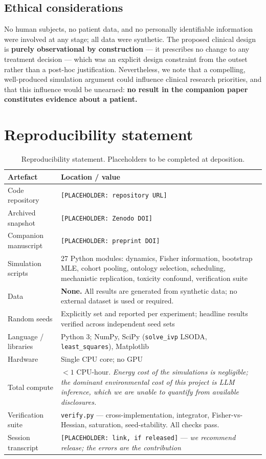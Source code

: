 \documentclass[11pt,a4paper]{article}
\begin{document}
\subsection{Ethical considerations}

No human subjects, no patient data, and no personally identifiable information were
involved at any stage; all data were synthetic. The proposed clinical design is
\textbf{purely observational by construction} --- it prescribes no change to any
treatment decision --- which was an explicit design constraint from the outset rather
than a post-hoc justification. Nevertheless, we note that a compelling, well-produced
simulation argument could influence clinical research priorities, and that this
influence would be unearned: \textbf{no result in the companion paper constitutes
evidence about a patient.}

\section{Reproducibility statement}

\begin{table}[h]
\centering
\small
\begin{tabular}{p{4.3cm}p{9.5cm}}
\toprule
\textbf{Artefact} & \textbf{Location / value}\\
\midrule
Code repository & \texttt{[PLACEHOLDER: repository URL]}\\
Archived snapshot & \texttt{[PLACEHOLDER: Zenodo DOI]}\\
Companion manuscript & \texttt{[PLACEHOLDER: preprint DOI]}\\
Simulation scripts & 27 Python modules: dynamics, Fisher information, bootstrap MLE, cohort pooling, ontology selection, scheduling, mechanistic replication, toxicity confound, verification suite\\
Data & \textbf{None.} All results are generated from synthetic data; no external dataset is used or required.\\
Random seeds & Explicitly set and reported per experiment; headline results verified across independent seed sets\\
Language / libraries & Python 3; NumPy, SciPy (\texttt{solve\_ivp} LSODA, \texttt{least\_squares}), Matplotlib\\
Hardware & Single CPU core; no GPU\\
Total compute & $<1$ CPU-hour. \emph{Energy cost of the simulations is negligible; the dominant environmental cost of this project is LLM inference, which we are unable to quantify from available disclosures.}\\
Verification suite & \texttt{verify.py} --- cross-implementation, integrator, Fisher-vs-Hessian, saturation, seed-stability. All checks pass.\\
Session transcript & \texttt{[PLACEHOLDER: link, if released]} --- \emph{we recommend release; the errors are the contribution}\\
\bottomrule
\end{tabular}
\caption{Reproducibility statement. Placeholders to be completed at deposition.}
\end{table}
\end{document}
